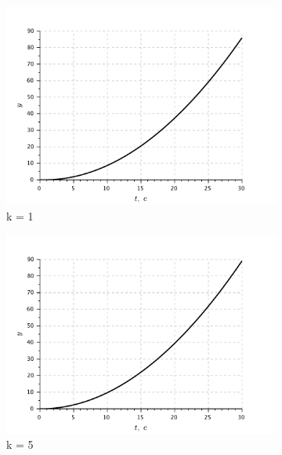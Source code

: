 \documentclass[a3paper, 11pt]{article}
\begin{document}
\begin{figure}[h!]
    \centering
    \begin{subfigure}{0.33\textwidth}
        \centering
        \includegraphics[width = \textwidth]{images/graph2-3-K1.pdf}
        \caption{k = 1}
    \end{subfigure}
    \begin{subfigure}{0.33\textwidth}
        \centering
        \includegraphics[width = \textwidth]{images/graph2-3-K5.pdf}
        \caption{k = 5}
    \end{subfigure}
    \begin{subfigure}{0.33\textwidth}
        \centering

\end{subfigure}
\end{figure}
\end{document}
